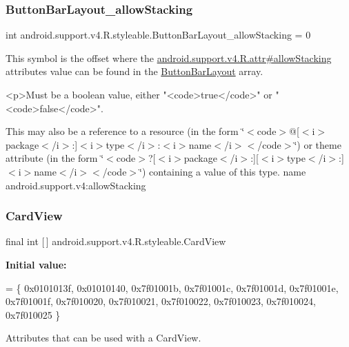 \subsubsection{\texorpdfstring{Button\+Bar\+Layout\+\_\+allow\+Stacking}{ButtonBarLayout\_allowStacking}}
{\footnotesize\ttfamily int android.\+support.\+v4.\+R.\+styleable.\+Button\+Bar\+Layout\+\_\+allow\+Stacking = 0\hspace{0.3cm}{\ttfamily [static]}}

This symbol is the offset where the \hyperlink{classandroid_1_1support_1_1v4_1_1R_1_1attr_ab166be6b5606db68828a302f162f8cd0}{android.\+support.\+v4.\+R.\+attr\#allow\+Stacking} attribute\textquotesingle{}s value can be found in the \hyperlink{classandroid_1_1support_1_1v4_1_1R_1_1styleable_ae83cd99b3980a7d0569414b072a8bd02}{Button\+Bar\+Layout} array.

\begin{DoxyVerb}      <p>Must be a boolean value, either "<code>true</code>" or "<code>false</code>".
\end{DoxyVerb}
 

This may also be a reference to a resource (in the form \char`\"{}$<$code$>$@\mbox{[}$<$i$>$package$<$/i$>$\+:\mbox{]}$<$i$>$type$<$/i$>$\+:$<$i$>$name$<$/i$>$$<$/code$>$\char`\"{}) or theme attribute (in the form \char`\"{}$<$code$>$?\mbox{[}$<$i$>$package$<$/i$>$\+:\mbox{]}\mbox{[}$<$i$>$type$<$/i$>$\+:\mbox{]}$<$i$>$name$<$/i$>$$<$/code$>$\char`\"{}) containing a value of this type.  name android.\+support.\+v4\+:allow\+Stacking \mbox{\label{classandroid_1_1support_1_1v4_1_1R_1_1styleable_a0e520cd4c78beb0d456e4018c4ba0e86}} 
\subsubsection{\texorpdfstring{Card\+View}{CardView}}
{\footnotesize\ttfamily final int \mbox{[}$\,$\mbox{]} android.\+support.\+v4.\+R.\+styleable.\+Card\+View\hspace{0.3cm}{\ttfamily [static]}}

{\bfseries Initial value\+:}
\begin{DoxyCode}
= \{
            0x0101013f, 0x01010140, 0x7f01001b, 0x7f01001c,
            0x7f01001d, 0x7f01001e, 0x7f01001f, 0x7f010020,
            0x7f010021, 0x7f010022, 0x7f010023, 0x7f010024,
            0x7f010025
        \}
\end{DoxyCode}
Attributes that can be used with a Card\+View. 

